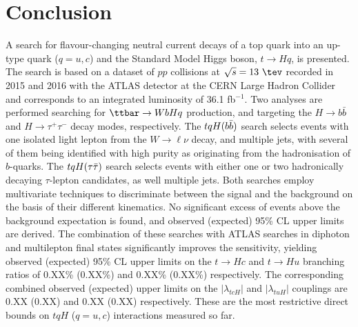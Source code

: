 \section{Conclusion}
\label{sec:conclusion}

A search for flavour-changing neutral current decays of a top quark into an up-type quark ($q=u, c$) and the Standard Model Higgs boson, $t\to Hq$, is presented. 
The search is based on a dataset of $pp$ collisions at $\sqrt{s}=13~\tev$ recorded in 2015 and 2016 with the ATLAS detector at the 
CERN Large Hadron Collider and corresponds to an integrated luminosity of 36.1 fb$^{-1}$.
Two analyses are performed searching for $\ttbar \to WbHq$ production, and targeting the $H \to b\bar{b}$ and $H \to \tau^+\tau^-$ decay modes, respectively.  
The $tqH(b\bar{b})$ search selects events with one isolated light lepton from the $W \to \ell\nu$ decay, and multiple jets, with several 
of them being identified with high purity as originating from the hadronisation of $b$-quarks. 
The $tqH(\tau\bar{\tau})$ search selects events with either one or two hadronically decaying $\tau$-lepton candidates, as well multiple jets. 
Both searches employ multivariate techniques to discriminate between the signal and the background on the basis of their different kinematics. 
No significant excess of events above the background expectation is found, and observed (expected) 95\% CL upper limits are derived.
The combination of these searches with ATLAS searches in diphoton and multilepton final states significantly improves the sensitivity, 
yielding observed (expected) 95\% CL upper limits on the $t\to Hc$ and $t\to Hu$ branching ratios of 0.XX\% (0.XX\%) and 0.XX\% (0.XX\%) respectively.
The corresponding combined observed (expected) upper limits on the $|\lambda_{tcH}|$ and $|\lambda_{tuH}|$ couplings are 0.XX (0.XX) and 0.XX (0.XX) respectively. 
These are the most restrictive direct bounds on $tqH$ ($q=u,c$) interactions measured so far.
